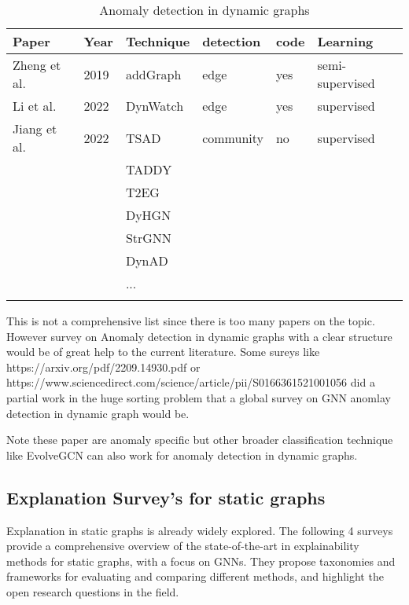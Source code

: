 \begin{table}
\caption{Anomaly detection in dynamic graphs}\label{tab1}
\begin{tabular}{|l|l|l|l|l|l|}
\hline
Paper &  Year & Technique & detection & code & Learning\\
\hline
Zheng et al.\cite{addGraph} & 2019 & addGraph & edge & yes & semi-supervised\\
Li et al.\cite{dynWatch} & 2022 & DynWatch  & edge & yes & supervised\\
Jiang et al.\cite{TSAD} & 2022 & TSAD & community & no & supervised\\
& & TADDY &  & & \\
 & & T2EG &  & & \\
 & & DyHGN &  & & \\
 & & StrGNN &  & & \\
 & & DynAD &  & & \\
 & & ... &  & & \\
 & &  &  & & \\
\hline
\end{tabular}
\end{table}

This is not a comprehensive list since there is too many papers on the topic. However survey on Anomaly detection in dynamic graphs with a clear structure would be of great help to the current literature. Some sureys like https://arxiv.org/pdf/2209.14930.pdf or https://www.sciencedirect.com/science/article/pii/S0166361521001056 did a partial work in the huge sorting problem that a global survey on GNN anomlay detection in dynamic graph would be.

Note these paper are anomaly specific but other broader classification technique like EvolveGCN\cite{egcn} can also work for anomaly detection in dynamic graphs.

\subsection{Explanation Survey's for static graphs}
Explanation in static graphs is already widely explored. The following 4 surveys provide a comprehensive overview of the state-of-the-art in explainability methods for static graphs, with a focus on GNNs. They propose taxonomies and frameworks for evaluating and comparing different methods, and highlight the open research questions in the field.

